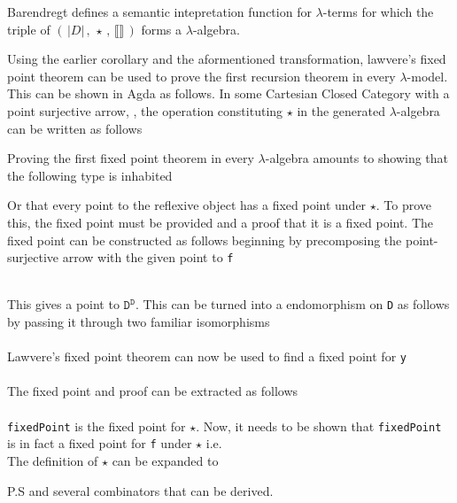Barendregt defines a semantic intepretation function for $\lambda$-terms for
which the triple of $( \, |D| \, , \, \star \, , \, \llbracket \rrbracket \,)$
forms a $\lambda$-algebra.


Using the earlier corollary and the aformentioned transformation, lawvere's
fixed point theorem can be used to prove the first recursion theorem in every
$\lambda$-model. This can be shown in Agda as follows. In some Cartesian Closed
Category with a point surjective arrow, , the operation
constituting $\star$ in the generated $\lambda$-algebra can be written as
follows


Proving the first fixed point theorem in every $\lambda$-algebra amounts to
showing that the following type is inhabited

Or that every point to the reflexive object has a fixed point under $\star$. To
prove this, the fixed point must be provided and a proof that it is a fixed
point. The fixed point can be constructed as follows beginning by precomposing the
point-surjective arrow with the given point to \verb|f|

\begin{AgdaMultiCode}
\\
This gives a point to $\texttt{D}^\texttt{D}$. This can be turned into a
endomorphism on \verb|D| as follows by passing it through two familiar
isomorphisms
\\
\\
Lawvere's fixed point theorem can now be used to find a fixed point for
\verb|y|
\\
\\
The fixed point and proof can be extracted as follows
\\
\\
\verb|fixedPoint| is the fixed point for $\star$. Now, it needs to be shown that
\verb|fixedPoint| is in fact a fixed point for \verb|f| under $\star$ i.e.
\\
The definition of $\star$ can be expanded to
\\
\end{AgdaMultiCode}



P.S and several combinators that can be derived.
